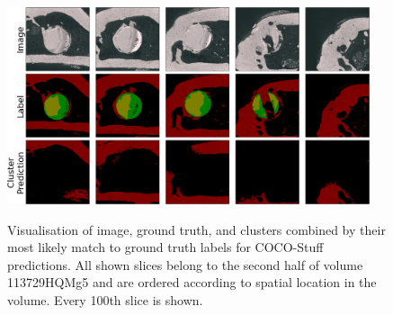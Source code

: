 \begin{figure}[!htb]
    \centering
    \includegraphics[width=0.95\textwidth]{pictures/experiment_1/cocostuff-combined_example_predictions_0_small}\\
    \caption[Additional Combined Clusters of COCO-Stuff]{Visualisation of image, ground truth, and clusters combined by their most likely match to ground truth labels for COCO-Stuff predictions. All shown slices belong to the second half of volume 113729HQMg5 and are ordered according to spatial location in the volume. Every 100th slice is shown.}
    \label{fig:more-cocostuff-predictions}
\end{figure}

